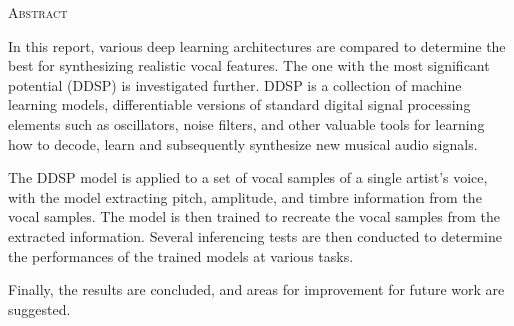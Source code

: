 \begin{center}
  \textsc{Abstract}
\end{center}

\noindent

In this report, various deep learning architectures are compared to determine the best for synthesizing realistic vocal features. The one with the most significant potential (DDSP) is investigated further. DDSP is a collection of machine learning models, differentiable versions of standard digital signal processing elements such as oscillators, noise filters, and other valuable tools for learning how to decode, learn and subsequently synthesize new musical audio signals.

The DDSP model is applied to a set of vocal samples of a single artist's voice, with the model extracting pitch, amplitude, and timbre information from the vocal samples. The model is then trained to recreate the vocal samples from the extracted information. Several inferencing tests are then conducted to determine the performances of the trained models at various tasks.

Finally, the results are concluded, and areas for improvement for future work are suggested.